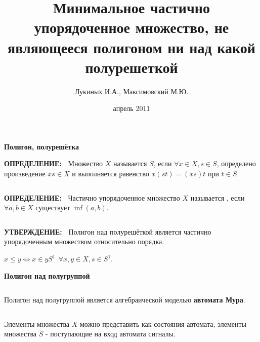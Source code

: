 \documentclass{beamer}
\title {Минимальное частично упорядоченное множество, не являющееся полигоном ни над какой полурешеткой}
\author{Лукиных И.А., Максимовский М.Ю.}
\date  {апрель 2011}
\newcommand{\green}{\color[rgb]{0,0.4,0}}
\newcommand{\blue}{\color{blue}}
\newcommand{\statement}{%
	 {\bf \green УТВЕРЖДЕНИЕ:\ }}
\newcommand{\definit}{%
     {\bf \green ОПРЕДЕЛЕНИЕ:\ }}
\newcommand{\retline}{
	
$ $

}
\begin{document}

\maketitle

\begin{frame}
{\bf {\blue} Полигон, полурешётка}

{\definit}
Множество $X$ называется \textit{\blue{полигоном над полугруппой}} $S$, если
$\forall x \in X, s \in S$, определено произведение
$xs \in X$ и выполняется равенство $x(st) = (xs)t$ при $t \in S$.
{\retline}

{\definit}
Частично упорядоченное множество $X$ называется \textit{\blue{полурешёткой}},
если $\forall a, b \in X$ существует $\inf (a, b)$. 
{\retline}

{\statement}
Полигон над полурешёткой является частично упорядоченным множеством  относительно порядка.
\begin{center}
$x \leq y \iff x \in yS^1 \ \ \forall x,y\in X, s\in S^1$.

\end{center}

\end{frame}

\begin{frame}
{\bf {\blue} Полигон над полугруппой}

{\retline}
Полигон над полугруппой является алгебраической моделью \textbf{автомата Мура}.
{\retline}

Элементы множества $X$ можно представить как состояния автомата, элементы множества $S$ - поступающие на вход автомата сигналы.

\end{frame}
\end{document}
